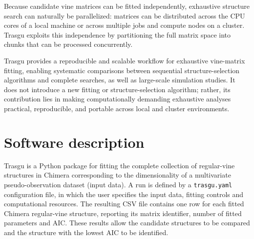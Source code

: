 \documentclass[preprint,12pt, a4paper]{elsarticle}
\begin{document}
Because candidate vine matrices can be fitted independently, exhaustive structure search can naturally be parallelized: matrices can be distributed across the CPU cores of a local machine or across multiple jobs and compute nodes on a cluster. Trasgu exploits this independence by partitioning the full matrix space into chunks that can be processed concurrently.

Trasgu provides a reproducible and scalable workflow for exhaustive vine-matrix fitting, enabling systematic comparisons between sequential structure-selection algorithms and complete searches, as well as large-scale simulation studies. It does not introduce a new fitting or structure-selection algorithm; rather, its contribution lies in making computationally demanding exhaustive analyses practical, reproducible, and portable across local and cluster environments.







\section{Software description}

Trasgu is a Python package for fitting the complete collection of regular-vine structures in Chimera corresponding to the dimensionality of a multivariate pseudo-observation dataset (input data). A run is defined by a \texttt{trasgu.yaml} configuration file, in which the user specifies the input data, fitting controls and computational resources. The resulting CSV file contains one row for each fitted Chimera regular-vine structure, reporting its matrix identifier, number of fitted parameters and AIC. These results allow the candidate structures to be compared and the structure with the lowest AIC to be identified.
\end{document}
